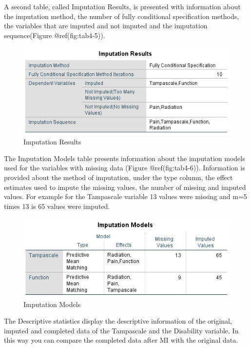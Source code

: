 \documentclass[
]{book}
\begin{document}
A second table, called Imputation Results, is presented with information
about the imputation method, the number of fully conditional
specification methods, the variables that are imputed and not imputed
and the imputation sequence(Figure @ref(fig:tab4-5)).

\begin{figure}

{\centering \includegraphics[width=0.9\linewidth]{images/tab4.5} 

}

\caption{Imputation Results}\label{fig:tab4-5}
\end{figure}

The Imputation Models table presents information about the imputation
models used for the variables with missing data (Figure
@ref(fig:tab4-6)). Information is provided about the method of
imputation, under the type column, the effect estimates used to impute
the missing values, the number of missing and imputed values. For
example for the Tampascale variable 13 values were missing and m=5 times
13 is 65 values were imputed.

\begin{figure}

{\centering \includegraphics[width=0.9\linewidth]{images/tab4.6} 

}

\caption{Imputation Models}\label{fig:tab4-6}
\end{figure}

The Descriptive statistics display the descriptive information of the
original, imputed and completed data of the Tampascale and the
Disability variable. In this way you can compare the completed data
after MI with the original data.
\end{document}
